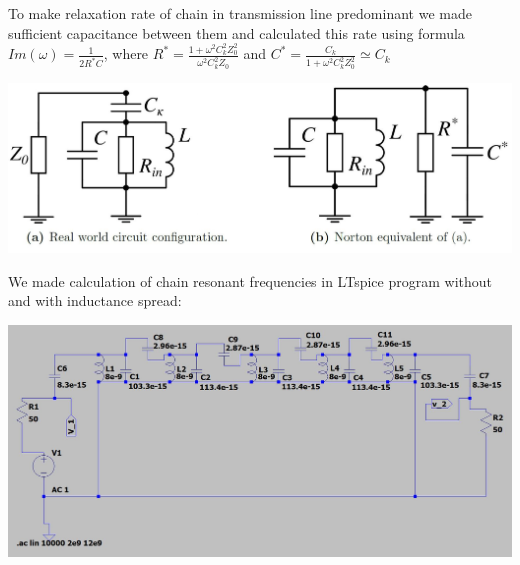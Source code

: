 \documentclass[a0, portrait]{a0poster}
\begin{document}
\begin{multicols}{2}
\begin{tcolorbox}[left=1cm, right=1cm, top=0.5cm, bottom=0.5cm, 
	title={\Large Relaxation in antenna}, bottomtitle=.3cm,toptitle=.5cm
	]
	\begin{flushleft}
	To make relaxation rate of chain in transmission line predominant we made sufficient capacitance between them and calculated this rate using formula $Im(\omega)=\frac{1}{2R^*C}$, where $R^* = \frac{1+\omega^2C_k^2Z_0^2}{\omega^2C_k^2Z_0}$ and $C^* = \frac{C_k}{1+\omega^2C_k^2Z_0^2} \simeq C_k$ 
	\end{flushleft}
	\begin{minipage}{0.8\textwidth}
		\centering
		\includegraphics[width=\textwidth]{relaxation}
		\begingroup
		\captionsetup[figure]{width=\textwidth}
		
		\endgroup
	\end{minipage}
	
\end{tcolorbox}




\begin{tcolorbox}[left=1cm, right=1cm, top=0.5cm, bottom=0.5cm, 
	title={\Large Dynamics simulation. Classical approach}, bottomtitle=.3cm,toptitle=.5cm
	]
	\begin{minipage}{\textwidth}
		
		We made calculation of chain resonant frequencies in LTspice program without and with inductance spread:
		
	\end{minipage}
	
	\begin{minipage}{0.49\textwidth}
		\includegraphics[width=\textwidth]{LTSpice_scheme}
		

\end{minipage}
\end{tcolorbox}
\end{multicols}
\end{document}

